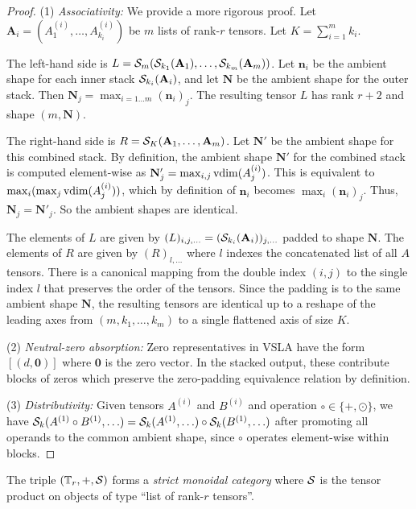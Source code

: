 \begin{proof}
(1) \emph{Associativity:} We provide a more rigorous proof. Let $\mathbf{A}_i = (A^{(i)}_1, \dots, A^{(i)}_{k_i})$ be $m$ lists of rank-$r$ tensors. Let $K = \sum_{i=1}^m k_i$. 

The left-hand side is $L = \mathcal{S}_m(\mathcal{S}_{k_1}(\mathbf{A}_1), \dots, \mathcal{S}_{k_m}(\mathbf{A}_m))$. Let $\mathbf{n}_i$ be the ambient shape for each inner stack $\mathcal{S}_{k_i}(\mathbf{A}_i)$, and let $\mathbf{N}$ be the ambient shape for the outer stack. Then $\mathbf{N}_j = \max_{i=1\dots m} (\mathbf{n}_i)_j$. The resulting tensor $L$ has rank $r+2$ and shape $(m, \mathbf{N})$.

The right-hand side is $R = \mathcal{S}_K(\mathbf{A}_1, \dots, \mathbf{A}_m)$. Let $\mathbf{N}'$ be the ambient shape for this combined stack. By definition, the ambient shape $\mathbf{N}'$ for the combined stack is computed element-wise as $\mathbf{N}'_j = \max_{i,j} \operatorname{vdim}(A^{(i)}_j)$. This is equivalent to $\max_i (\max_j \operatorname{vdim}(A^{(i)}_j))$, which by definition of $\mathbf{n}_i$ becomes $\max_i (\mathbf{n}_i)_j$. Thus, $\mathbf{N}_j = \mathbf{N}'_j$. So the ambient shapes are identical.

The elements of $L$ are given by $(L)_{i,j,...} = (\mathcal{S}_{k_i}(\mathbf{A}_i))_{j,...}$ padded to shape $\mathbf{N}$. The elements of $R$ are given by $(R)_{l,...}$ where $l$ indexes the concatenated list of all $A$ tensors. There is a canonical mapping from the double index $(i,j)$ to the single index $l$ that preserves the order of the tensors. Since the padding is to the same ambient shape $\mathbf{N}$, the resulting tensors are identical up to a reshape of the leading axes from $(m, k_1, \dots, k_m)$ to a single flattened axis of size $K$.

(2) \emph{Neutral-zero absorption:} Zero representatives in VSLA have the form $[(d, \mathbf{0})]$ where $\mathbf{0}$ is the zero vector. In the stacked output, these contribute blocks of zeros which preserve the zero-padding equivalence relation by definition.

(3) \emph{Distributivity:} Given tensors $A^{(i)}$ and $B^{(i)}$ and operation $\circ \in \{+, \odot\}$, we have $\mathcal{S}_k(A^{(1)} \circ B^{(1)}, \ldots) = \mathcal{S}_k(A^{(1)}, \ldots) \circ \mathcal{S}_k(B^{(1)}, \ldots)$ after promoting all operands to the common ambient shape, since $\circ$ operates element-wise within blocks.
\end{proof}

\begin{proposition}
The triple $(\mathbb{T}_r, +, \mathcal{S})$ forms a \emph{strict monoidal category} where $\mathcal{S}$ is the tensor product on objects of type ``list of rank-$r$ tensors''.
\end{proposition}


